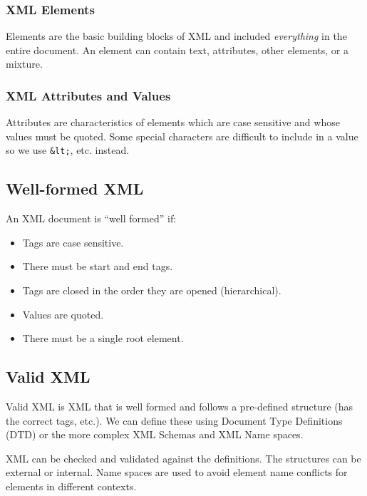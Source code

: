 \subsubsection{XML Elements}\label{ssub:xml_elements}

Elements are the basic building blocks of XML and included \emph{everything} in the entire document.
An element can contain text, attributes, other elements, or a mixture.

\subsubsection{XML Attributes and Values}\label{ssub:xml_attributes_and_values}

Attributes are characteristics of elements which are case sensitive and whose values must be quoted.
Some special characters are difficult to include in a value so we use \texttt{&lt;}, etc. instead.

\subsection{Well-formed XML}\label{sub:well_formed_xml}

An XML document is ``well formed'' if:
\begin{itemize}
    \item Tags are case sensitive.
    \item There must be start and end tags.
    \item Tags are closed in the order they are opened (hierarchical).
    \item Values are quoted.
    \item There must be a single root element.
\end{itemize}

\subsection{Valid XML}\label{sub:valid_xml}

Valid XML is XML that is well formed and follows a pre-defined structure (has the correct tags, etc.).
We can define these using Document Type Definitions (DTD) or the more complex XML Schemas and XML Name spaces.

XML can be checked and validated against the definitions.
The structures can be external or internal.
Name spaces are used to avoid element name conflicts for elements in different contexts.

